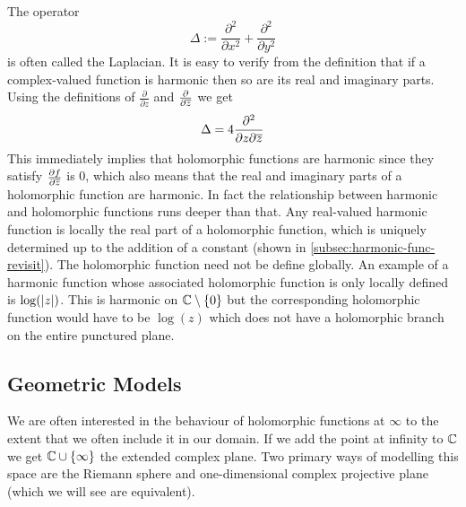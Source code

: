 The operator
$$\Delta := \frac{\partial^2}{\partial x^2} + \frac{\partial^2}{\partial y^2}$$
is often called the Laplacian. It is easy to verify from the definition that if a complex-valued function is harmonic then so are its real and imaginary parts. Using the definitions of $\frac{\partial}{\partial z}$ and $\frac{\partial}{\partial \overline{z}}$ we get
$$\Delta = 4\frac{\partial^2}{\partial z \partial \overline{z}}$$
This immediately implies that holomorphic functions are harmonic since they satisfy $\frac{\partial f}{\partial \overline{z}}$ is 0, which also means that the real and imaginary parts of a holomorphic function are harmonic. In fact the relationship between harmonic and holomorphic functions runs deeper than that. Any real-valued harmonic function is locally the real part of a holomorphic function, which is uniquely determined up to the addition of a constant (shown in \autoref{subsec:harmonic-func-revisit}). The holomorphic function need not be define globally. An example of a harmonic function whose associated holomorphic function is only locally defined is $\log(\left|z\right|)$. This is harmonic on $\mathbb{C} \setminus \{0\}$ but the corresponding holomorphic function would have to be $\log(z)$ which does not have a holomorphic branch on the entire punctured plane.

\subsection{Geometric Models}
We are often interested in the behaviour of holomorphic functions at $\infty$ to the extent that we often include it in our domain. If we add the point at infinity to $\mathbb{C}$ we get $\mathbb{C} \cup \{\infty\}$ the extended complex plane. Two primary ways of modelling this space are the Riemann sphere and one-dimensional complex projective plane (which we will see are equivalent).

